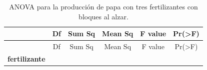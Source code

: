 \documentclass[]{book}
\theoremstyle{definition}
\theoremstyle{definition}
\theoremstyle{definition}
\theoremstyle{remark}
\begin{document}
\begin{longtable}[]{@{}cccccc@{}}
\caption{\label{tab:anova-fert} ANOVA para la producción de papa con tres
fertilizantes con bloques al alzar.}\tabularnewline
\toprule
\begin{minipage}[b]{0.22\columnwidth}\centering
~\strut
\end{minipage} & \begin{minipage}[b]{0.06\columnwidth}\centering
Df\strut
\end{minipage} & \begin{minipage}[b]{0.10\columnwidth}\centering
Sum Sq\strut
\end{minipage} & \begin{minipage}[b]{0.12\columnwidth}\centering
Mean Sq\strut
\end{minipage} & \begin{minipage}[b]{0.12\columnwidth}\centering
F value\strut
\end{minipage} & \begin{minipage}[b]{0.13\columnwidth}\centering
Pr(\textgreater{}F)\strut
\end{minipage}\tabularnewline
\midrule
\endfirsthead
\toprule
\begin{minipage}[b]{0.22\columnwidth}\centering
~\strut
\end{minipage} & \begin{minipage}[b]{0.06\columnwidth}\centering
Df\strut
\end{minipage} & \begin{minipage}[b]{0.10\columnwidth}\centering
Sum Sq\strut
\end{minipage} & \begin{minipage}[b]{0.12\columnwidth}\centering
Mean Sq\strut
\end{minipage} & \begin{minipage}[b]{0.12\columnwidth}\centering
F value\strut
\end{minipage} & \begin{minipage}[b]{0.13\columnwidth}\centering
Pr(\textgreater{}F)\strut
\end{minipage}\tabularnewline
\midrule
\endhead
\begin{minipage}[t]{0.22\columnwidth}\centering
\textbf{fertilizante}\strut
\end{minipage} & \begin{minipage}[t]{0.06\columnwidth}\centering
2\strut
\end{minipage} & \begin{minipage}[t]{0.10\columnwidth}\centering

\end{minipage}
\end{longtable}
\end{document}
